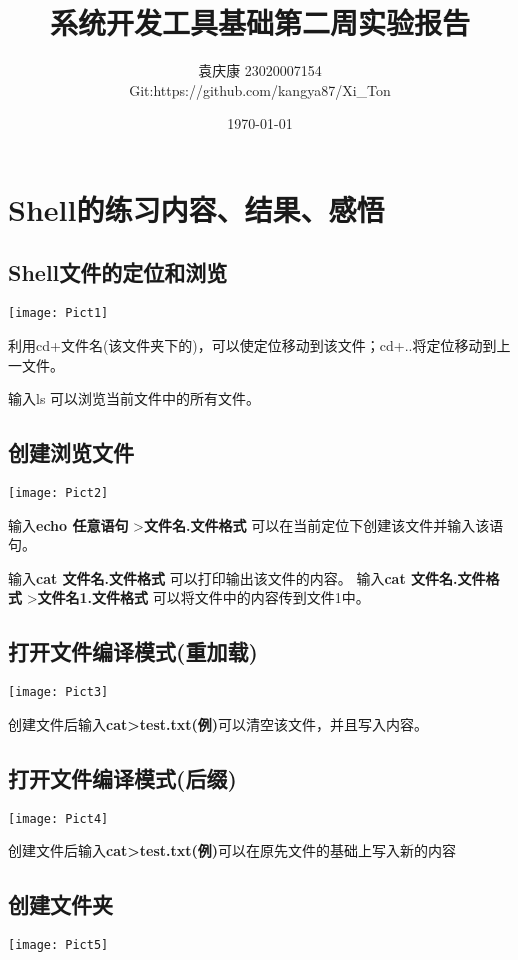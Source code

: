 \documentclass[a4paper, 12pt]{article}
\begin{document}
\title{\textbf{系统开发工具基础第二周实验报告}}
\author{袁庆康 23020007154 \\Git:https://github.com/kangya87/Xi\_Ton}
\date{\today}
\maketitle

\tableofcontents
\newpage
{}

\section{\large Shell的练习内容、结果、感悟}
\subsection{\small Shell文件的定位和浏览}

\texttt{[image: Pict1]}

利用cd+文件名(该文件夹下的)，可以使定位移动到该文件；cd+..将定位移动到上一文件。

输入ls 可以浏览当前文件中的所有文件。
\subsection{\small 创建浏览文件}
\texttt{[image: Pict2]}

输入\textbf{echo 任意语句} \textgreater \textbf{文件名.文件格式} 可以在当前定位下创建该文件并输入该语句。

输入\textbf{cat 文件名.文件格式} 可以打印输出该文件的内容。
输入\textbf{cat 文件名.文件格式} \textgreater \textbf{文件名1.文件格式} 可以将文件中的内容传到文件1中。
\subsection{\small 打开文件编译模式(重加载)}
\texttt{[image: Pict3]}

创建文件后输入\textbf{cat>test.txt(例)}可以清空该文件，并且写入内容。
\subsection{\small 打开文件编译模式(后缀)}
\texttt{[image: Pict4]}

创建文件后输入\textbf{cat>test.txt(例)}可以在原先文件的基础上写入新的内容
\subsection{\small 创建文件夹}
\texttt{[image: Pict5]}
\end{document}
